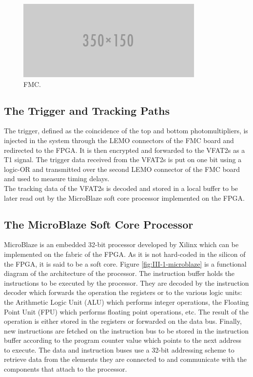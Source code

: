       \begin{figure}[h!]
        \centering
        \includegraphics[width=\textwidth]{img/empty.png}
        \caption{FMC.}
        \label{fig:III-1-fmc}
      \end{figure}

    \subsection{The Trigger and Tracking Paths}

      The trigger, defined as the coincidence of the top and bottom photomultipliers, is injected in the system through the LEMO connectors of the FMC board and redirected to the FPGA. It is then encrypted and forwarded to the VFAT2s as a T1 signal. The trigger data received from the VFAT2s is put on one bit using a logic-OR and transmitted over the second LEMO connector of the FMC board and used to measure timing delays. \\

      The tracking data of the VFAT2s is decoded and stored in a local buffer to be later read out by the MicroBlaze soft core processor implemented on the FPGA.

    \subsection{The MicroBlaze Soft Core Processor}

      MicroBlaze is an embedded 32-bit processor developed by Xilinx which can be implemented on the fabric of the FPGA. As it is not hard-coded in the silicon of the FPGA, it is said to be a soft core. Figure \ref{fig:III-1-microblaze} is a functional diagram of the architecture of the processor. The instruction buffer holds the instructions to be executed by the processor. They are decoded by the instruction decoder which forwards the operation the registers or to the various logic units: the Arithmetic Logic Unit (ALU) which performs integer operations, the Floating Point Unit (FPU) which performs floating point operations, etc. The result of the operation is either stored in the registers or forwarded on the data bus. Finally, new instructions are fetched on the instruction bus to be stored in the instruction buffer according to the program counter value which points to the next address to execute. The data and instruction buses use a 32-bit addressing scheme to retrieve data from the elements they are connected to and communicate with the components that attach to the processor. \\

